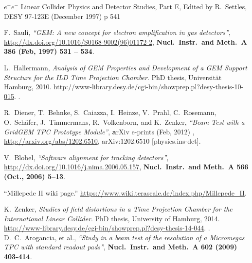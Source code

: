 

\begin{thebibliography}{9}



$e^+ e^-$ Linear Collider Physics and Detector Studies, Part E,
Edited by R.~Settles, DESY 97-123E (December 1997) p 541






F.~Sauli, \textit{``{GEM: A new concept for electron amplification in gas detectors}''},
  \url{http://dx.doi.org/10.1016/S0168-9002(96)01172-2}, {\textbf{ {Nucl.~Instr.~and Meth.~A} {\bfseries 386} (Feb,
  1997) 531 -- 534}}.

  











L.~Hallermann, {\textit{Analysis of GEM Properties and Development of a GEM
  Support Structure for the ILD Time Projection Chamber}}.
\newblock PhD thesis, {Universit\"at Hamburg}, 2010.
\newblock
  \url{http://www-library.desy.de/cgi-bin/showprep.pl?desy-thesis-10-015}.
.

R.~Diener, T.~Behnke, S.~Caiazza, I.~Heinze, V.~{Prahl}, C.~Rosemann,
  O.~Sch{\"a}fer, J.~Timmermans, R.~{Volkenborn}, and K.~Zenker, \textit{``{Beam Test
  with a GridGEM TPC Prototype Module}''}, {\textbf arXiv e-prints} (Feb, 2012) ,
  \url{http://arxiv.org/abs/1202.6510}, {{\ttfamily arXiv:1202.6510
  [physics.ins-det]}}.


V.~Blobel, \textit{``{Software alignment for tracking detectors}''},
  \url{http://dx.doi.org/10.1016/j.nima.2006.05.157}, {{\textbf {Nucl.~Instr.~and Meth.~A {\bfseries 566} (Oct., 2006) 5--13}}}.


``{Millepede II wiki page}.''
  \url{https://www.wiki.terascale.de/index.php/Millepede_II}.


K.~Zenker, {\textit {Studies of field distortions in a Time Projection Chamber for
  the International Linear Collider}}.
\newblock PhD thesis, {University of Hamburg}, 2014.
\newblock
  \url{http://www-library.desy.de/cgi-bin/showprep.pl?desy-thesis-14-044}.
.
D.~C.~Arogancia, et al., \textit{``Study in a beam test of the resolution of a Micromegas TPC with standard readout pads''}, \textbf{Nucl.~Instr.~and Meth.~A 602 (2009) 403-414}.


\end{thebibliography}
